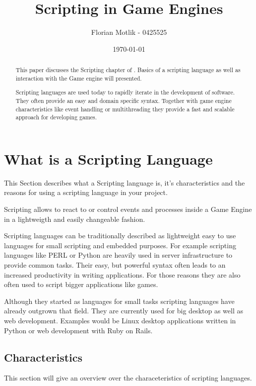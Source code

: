 \documentclass{article}
\begin{document}
\author{Florian Motlik - 0425525}
\title{Scripting in Game Engines}
\date{\today}
\maketitle

\tableofcontents
\newpage

\begin{abstract}
This paper discusses the Scripting chapter of \cite{gregory2009game}. Basics
of a scripting language as well as interaction with the Game engine will presented.

Scripting languages are used today to rapidly iterate in the development of software.
They often provide an easy and domain specific syntax. Together with game engine 
characteristics like event handling or multithreading they provide a fast and scalable
approach for developing games.
\end{abstract}

\section{What is a Scripting Language}
This Section describes what a Scripting language is, it's characteristics and
the reasons for using a scripting language in your project.

Scripting allows to react to or control events and processes inside a 
Game Engine in a lightweigth and easily changeable fashion.

Scripting languages can be traditionally described as lightweight easy to use
languages for small scripting and embedded purposes. For example scripting
languages like PERL or Python are heavily used in server infrastructure to
provide common tasks. Their easy, but powerful syntax often leads to an increased
productivity in writing applications. For those reasons they are also often used to
script bigger applications like games.

Although they started as languages for small tasks scripting languages have
already outgrown that field. They are currently used for big desktop as well
as web development. Examples would be Linux desktop applications written in
Python or web development with Ruby on Rails.
\subsection{Characteristics} \label{sec-characteristics}
This section will give an overview over the characeteristics of scripting
languages.
\end{document}
